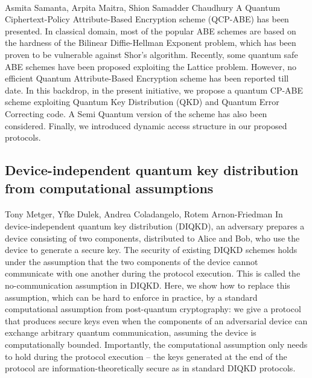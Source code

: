 \documentclass{article}%
\begin{document}
\paragraph{}%
Asmita Samanta, Arpita Maitra, Shion Samadder Chaudhury%
A Quantum Ciphertext-Policy Attribute-Based Encryption scheme (QCP-ABE) has been presented. In classical domain, most of the popular ABE schemes are based on the hardness of the Bilinear Diffie-Hellman Exponent problem, which has been proven to be vulnerable against Shor's algorithm. Recently, some quantum safe ABE schemes have been proposed exploiting the Lattice problem. However, no efficient Quantum Attribute-Based Encryption scheme has been reported till date. In this backdrop, in the present initiative, we propose a quantum CP-ABE scheme exploiting Quantum Key Distribution (QKD) and Quantum Error Correcting code. A Semi Quantum version of the scheme has also been considered. Finally, we introduced dynamic access structure in our proposed protocols.

%
\subsection{Device-independent quantum key distribution from computational   assumptions}%
\label{subsec:Device{-}independentquantumkeydistributionfromcomputationalassumptions}%
\paragraph{}%
Tony Metger, Yfke Dulek, Andrea Coladangelo, Rotem Arnon{-}Friedman%
In device-independent quantum key distribution (DIQKD), an adversary prepares a device consisting of two components, distributed to Alice and Bob, who use the device to generate a secure key. The security of existing DIQKD schemes holds under the assumption that the two components of the device cannot communicate with one another during the protocol execution. This is called the no-communication assumption in DIQKD. Here, we show how to replace this assumption, which can be hard to enforce in practice, by a standard computational assumption from post-quantum cryptography: we give a protocol that produces secure keys even when the components of an adversarial device can exchange arbitrary quantum communication, assuming the device is computationally bounded. Importantly, the computational assumption only needs to hold during the protocol execution -- the keys generated at the end of the protocol are information-theoretically secure as in standard DIQKD protocols.
\end{document}
